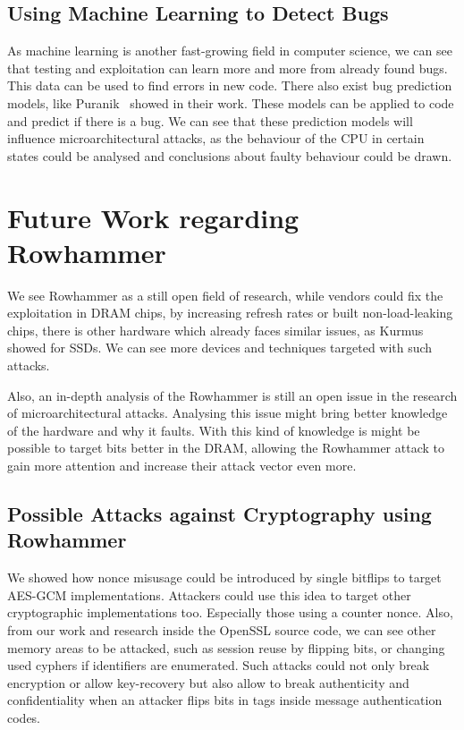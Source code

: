 \subsection{Using Machine Learning to Detect Bugs}

As machine learning is another fast-growing field in computer science, we can
see that testing and exploitation can learn more and more from already found
bugs. This data can be used to find errors in new code. There also exist bug
prediction models, like Puranik~\etal\cite{bugprediction} showed in their work.
These models can be applied to code and predict if there is a bug. We can see
that these prediction models will influence microarchitectural attacks, as the
behaviour of the CPU in certain states could be analysed and conclusions about
faulty behaviour could be drawn.

\section{Future Work regarding Rowhammer}

We see Rowhammer as a still open field of research, while vendors could fix the
exploitation in DRAM chips, by increasing refresh rates or built
non-load-leaking chips, there is other hardware which already faces similar
issues, as Kurmus~\etal\cite{rowssdhammer} showed for SSDs. We can see more
devices and techniques targeted with such attacks.

Also, an in-depth analysis of the Rowhammer is still an open issue in the
research of microarchitectural attacks. Analysing this issue might bring better
knowledge of the hardware and why it faults. With this kind of knowledge is
might be possible to target bits better in the DRAM, allowing the Rowhammer
attack to gain more attention and increase their attack vector even more.

\subsection{Possible Attacks against Cryptography using Rowhammer}

We showed how nonce misusage could be introduced by single bitflips to target
AES-GCM implementations. Attackers could use this idea to target other
cryptographic implementations too. Especially those using a counter nonce. Also,
from our work and research inside the OpenSSL source code, we can see other
memory areas to be attacked, such as session reuse by flipping bits, or changing
used cyphers if identifiers are enumerated. Such attacks could not only break
encryption or allow key-recovery but also allow to break authenticity and
confidentiality when an attacker flips bits in tags inside message
authentication codes.

